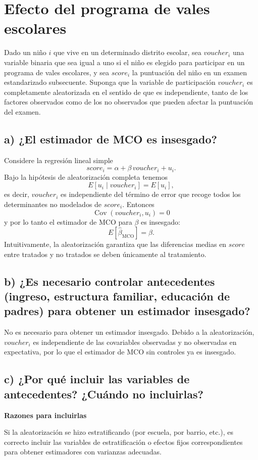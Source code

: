 \documentclass[12pt]{article}
\begin{document}
\section{Efecto del programa de vales escolares}

Dado un niño $i$ que vive en un determinado distrito escolar, sea $voucher_i$ una variable binaria que sea igual a uno si el niño es elegido para participar en un programa de vales escolares, y sea $score_i$ la puntuación del niño en un examen estandarizado subsecuente. Suponga que la variable de participación $voucher_i$ es completamente aleatorizada en el sentido de que es independiente, tanto de los factores observados como de los no observados que pueden afectar la puntuación del examen.

\subsection*{a) ¿El estimador de MCO es insesgado?}
Considere la regresión lineal simple
\[
score_i = \alpha + \beta\,voucher_i + u_i.
\]
Bajo la hipótesis de aleatorización completa tenemos
\[
E[u_i \mid voucher_i] = E[u_i],
\]
es decir, $voucher_i$ es independiente del término de error que recoge todos los determinantes no modelados de $score_i$. Entonces
\[
\operatorname{Cov}(voucher_i, u_i)=0
\]
y por lo tanto el estimador de MCO para $\beta$ es insesgado:
\[
E[\hat\beta_{\text{MCO}}]=\beta.
\]
Intuitivamente, la aleatorización garantiza que las diferencias medias en $score$ entre tratados y no tratados se deben únicamente al tratamiento.

\subsection*{b) ¿Es necesario controlar antecedentes (ingreso, estructura familiar, educación de padres) para obtener un estimador insesgado?}
No es necesario para obtener un estimador insesgado. Debido a la aleatorización, $voucher_i$ es independiente de las covariables observadas y no observadas en expectativa, por lo que el estimador de MCO sin controles ya es insesgado.

\subsection*{c) ¿Por qué incluir las variables de antecedentes? ¿Cuándo no incluirlas?}
\textbf{Razones para incluirlas}

Si la aleatorización se hizo estratificando (por escuela, por barrio, etc.), es correcto incluir las variables de estratificación o efectos fijos correspondientes para obtener estimadores con varianzas adecuadas.
\end{document}
